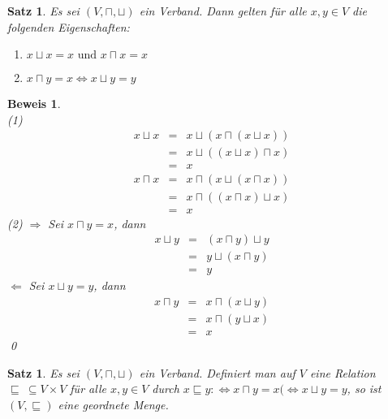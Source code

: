 \documentclass[ngerman]{scrartcl}
\theoremstyle{custom}
\newtheorem{ms}[mdef]{Satz}
\newtheorem*{bw}{Beweis}
\newcommand{\0}{\mathbf{0}}
\newcommand{\1}{\mathbf{L}}
\begin{document}
\begin{ms}
Es sei $(V, \sqcap, \sqcup)$ ein Verband. Dann gelten f\"ur alle $x,y
\in V$ die folgenden Eigenschaften:
\begin{enumerate}
\item $x \sqcup x = x \text{ und } x \sqcap x = x$
\item $x \sqcap y = x \Leftrightarrow x \sqcup y = y$
\end{enumerate}
\end{ms}

\begin{bw}~\\
(1)
\begin{eqnarray*}
x \sqcup x &=& x \sqcup (x \sqcap (x \sqcup x))\\
&=& x \sqcup ((x \sqcup x) \sqcap x)\\
&=& x
\end{eqnarray*}
\begin{eqnarray*}
x \sqcap x &=& x \sqcap (x \sqcup (x \sqcap x)) \\
&=& x \sqcap ((x \sqcap x) \sqcup x) \\
&=& x
\end{eqnarray*} 
(2) 
$\Rightarrow$ Sei $x \sqcap y = x$, dann
\begin{eqnarray*}
x \sqcup y &=& (x \sqcap y) \sqcup y \\
&=& y \sqcup (x \sqcap y) \\
&=& y
\end{eqnarray*}
$\Leftarrow$ Sei $x \sqcup y = y$, dann
\begin{eqnarray*}
x \sqcap y &=& x \sqcap (x \sqcup y) \\
&=& x \sqcap (y \sqcup x) \\
&=& x
\end{eqnarray*}
\qed
\end{bw}

\begin{ms} Es sei $(V, \sqcap, \sqcup)$ ein Verband. Definiert man auf
  $V$ eine Relation $\sqsubseteq ~\subseteq V \times V$ f\"ur alle
  $x,y \in V$ durch $x \sqsubseteq y :\Longleftrightarrow x \sqcap y =
  x (\Longleftrightarrow x \sqcup y = y$, so ist $(V, \sqsubseteq)$
  eine geordnete Menge.
\end{ms}
\end{document}
